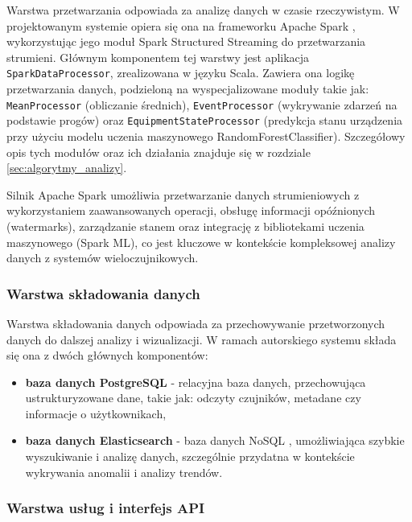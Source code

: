 Warstwa przetwarzania odpowiada za analizę danych w czasie rzeczywistym. W projektowanym systemie opiera się ona na frameworku Apache Spark \cite{spark_streaming}, wykorzystując jego moduł Spark Structured Streaming do przetwarzania strumieni. Głównym komponentem tej warstwy jest aplikacja \texttt{SparkDataProcessor}, zrealizowana w języku Scala. Zawiera ona logikę przetwarzania danych, podzieloną na wyspecjalizowane moduły takie jak: \texttt{MeanProcessor} (obliczanie średnich), \texttt{EventProcessor} (wykrywanie zdarzeń na podstawie progów) oraz \texttt{EquipmentStateProcessor} (predykcja stanu urządzenia przy użyciu modelu uczenia maszynowego RandomForestClassifier). Szczegółowy opis tych modułów oraz ich działania znajduje się w rozdziale \ref{sec:algorytmy_analizy}.

Silnik Apache Spark umożliwia przetwarzanie danych strumieniowych z wykorzystaniem zaawansowanych operacji, obsługę informacji opóźnionych (watermarks), zarządzanie stanem oraz integrację z bibliotekami uczenia maszynowego (Spark ML), co jest kluczowe w kontekście kompleksowej analizy danych z systemów wieloczujnikowych.

\newpage


\subsubsection{Warstwa składowania danych}
\label{subsubsec:warstwa_skladowania}

Warstwa składowania danych odpowiada za przechowywanie przetworzonych danych do dalszej analizy i wizualizacji. W ramach autorskiego systemu składa się ona z dwóch głównych komponentów:

\begin{itemize}
    \item \textbf{baza danych PostgreSQL} - relacyjna baza danych, przechowująca ustrukturyzowane dane, takie jak: odczyty czujników, metadane czy informacje o użytkownikach,
    \item \textbf{baza danych Elasticsearch} - baza danych NoSQL \cite{nosql_definition}, umożliwiająca szybkie wyszukiwanie i analizę danych, szczególnie przydatna w kontekście wykrywania anomalii i analizy trendów.
\end{itemize}

\subsubsection{Warstwa usług i interfejs API}
\label{subsubsec:warstwa_uslug}

